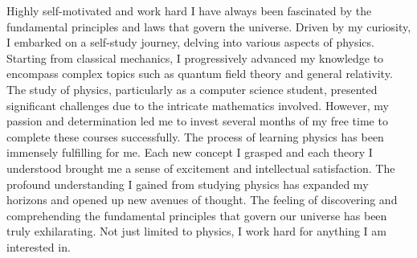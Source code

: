 
\begin{cventries}

	\cventry
	{} %
	{Highly self-motivated and work hard} %
	{} %
	{} %
	{
		\quad I have always been fascinated by the fundamental principles and laws that govern the universe. Driven by my curiosity, I embarked on a self-study journey, delving into various aspects of physics. Starting from classical mechanics, I progressively advanced my knowledge to encompass complex topics such as quantum field theory and general relativity. The study of physics, particularly as a computer science student, presented significant challenges due to the intricate mathematics involved. However, my passion and determination led me to invest several months of my free time to complete these courses successfully. \newline
		\quad The process of learning physics has been immensely fulfilling for me. Each new concept I grasped and each theory I understood brought me a sense of excitement and intellectual satisfaction. The profound understanding I gained from studying physics has expanded my horizons and opened up new avenues of thought. The feeling of discovering and comprehending the fundamental principles that govern our universe has been truly exhilarating. Not just limited to physics, I work hard for anything I am interested in. \newline
	}
\end{cventries}
